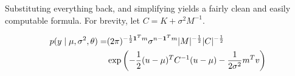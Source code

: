 \documentclass{article}
\newcommand{\one}{\mathbf{1}}
\DeclarePairedDelimiter{\Det}{\lvert}{\rvert}
\begin{document}
Substituting everything back, and simplifying yields a fairly clean and easily computable formula.
For brevity, let $C = K + \sigma^2 M^{-1}$.

\begin{equation}
\begin{split}
    p(y \mid \mu, \sigma^2, \theta)
    = &
    (2 \pi)^{-\frac{1}{2} \one^T m}
    \sigma^{n - \one^T m}
    \Det{M}^{-\frac{1}{2}}
    \Det{C}^{-\frac{1}{2}}
    \\
    & \exp\left(
        -\frac{1}{2} (u - \mu)^T C^{-1} (u - \mu)
        - \frac{1}{2\sigma^2} m^T v
    \right)
\end{split}
\end{equation}
\end{document}
